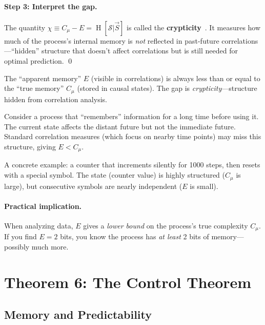 \documentclass[11pt,a4paper]{article}
\theoremstyle{definition}
\theoremstyle{plain}
\newcommand{\Cmu}{C_\mu}
\newcommand{\calS}{\mathcal{S}}
\newcommand{\Future}{\overrightarrow{S}}
\DeclareMathOperator{\Ent}{H}
\begin{document}
\paragraph{Step 3: Interpret the gap.}
The quantity $\chi \equiv \Cmu - E = \Ent[\calS | \Future]$ is called the \textbf{crypticity}~\cite{james2011anatomy}. It measures how much of the process's internal memory is \emph{not} reflected in past-future correlations---``hidden'' structure that doesn't affect correlations but is still needed for optimal prediction. \qed

\begin{intuition}
The ``apparent memory'' $E$ (visible in correlations) is always less than or equal to the ``true memory'' $\Cmu$ (stored in causal states). The gap is \emph{crypticity}---structure hidden from correlation analysis.
\end{intuition}

\begin{example}[title=When $E < \Cmu$: Cryptic Processes]
Consider a process that ``remembers'' information for a long time before using it. The current state affects the distant future but not the immediate future. Standard correlation measures (which focus on nearby time points) may miss this structure, giving $E < \Cmu$.

A concrete example: a counter that increments silently for 1000 steps, then resets with a special symbol. The state (counter value) is highly structured ($\Cmu$ is large), but consecutive symbols are nearly independent ($E$ is small).
\end{example}

\paragraph{Practical implication.} When analyzing data, $E$ gives a \emph{lower bound} on the process's true complexity $\Cmu$. If you find $E = 2$ bits, you know the process has \emph{at least} 2 bits of memory---possibly much more.

\section{Theorem 6: The Control Theorem}
\label{sec:theorem-control}

\subsection{Memory and Predictability}
\end{document}
